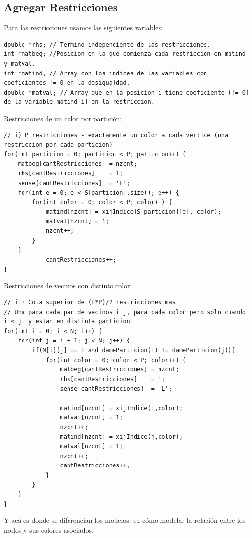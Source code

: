 \documentclass[a4paper, 10pt, twoside]{article}
\begin{document}
\subsection{Agregar Restricciones}

Para las restricciones usamos las siguientes variables:

\begin{lstlisting}
double *rhs; // Termino independiente de las restricciones.
int *matbeg; //Posicion en la que comienza cada restriccion en matind y matval.
int *matind; // Array con los indices de las variables con coeficientes != 0 en la desigualdad.
double *matval; // Array que en la posicion i tiene coeficiente (!= 0) de la variable matind[i] en la restriccion.
\end{lstlisting}

Restricciones de un color por partición:

\begin{lstlisting}
// i) P restricciones - exactamente un color a cada vertice (una restriccion por cada particion)
for(int particion = 0; particion < P; particion++) {
	matbeg[cantRestricciones] = nzcnt;
	rhs[cantRestricciones]    = 1;
	sense[cantRestricciones]  = 'E';
	for(int e = 0; e < S[particion].size(); e++) {
		for(int color = 0; color < P; color++) {
			matind[nzcnt] = xijIndice(S[particion][e], color);
			matval[nzcnt] = 1;
			nzcnt++;
		}
	}
			cantRestricciones++;
}
\end{lstlisting}

Restricciones de vecinos con distinto color:

\begin{lstlisting}
// ii) Cota superior de (E*P)/2 restricciones mas
// Una para cada par de vecinos i j, para cada color pero solo cuando i < j, y estan en distinta particion
for(int i = 0; i < N; i++) {
	for(int j = i + 1; j < N; j++) { 
		if(M[i][j] == 1 and dameParticion(i) != dameParticion(j)){
			for(int color = 0; color < P; color++) {
				matbeg[cantRestricciones] = nzcnt;
				rhs[cantRestricciones]    = 1;
				sense[cantRestricciones]  = 'L';

				matind[nzcnt] = xijIndice(i,color);
				matval[nzcnt] = 1;
				nzcnt++;
				matind[nzcnt] = xijIndice(j,color);
				matval[nzcnt] = 1;
				nzcnt++;
				cantRestricciones++;
			}
		}
	}
}
\end{lstlisting}

Y acá es donde se diferencian los modelos: en cómo modelar la relación entre los nodos y sus colores asociados.
\end{document}
